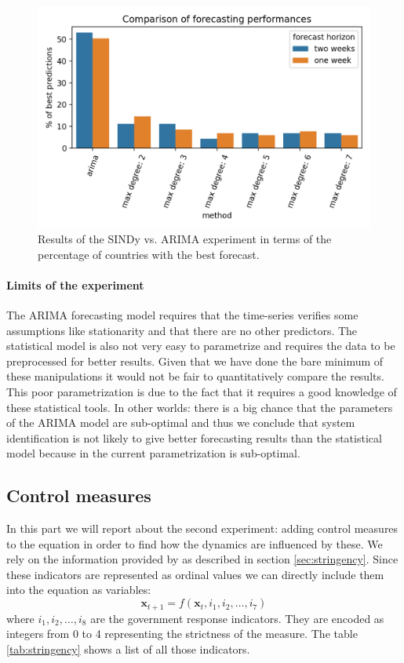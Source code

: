 \documentclass[12pt, letterpaper]{article}
\begin{document}
\begin{figure}[h]
\centering
\includegraphics[scale=0.8]{forecasting.png}
\caption{Results of the SINDy vs. ARIMA experiment in terms of the percentage of countries with the best forecast.}
\label{fig:forecast_frequency}
\end{figure}

\paragraph{Limits of the experiment}

The ARIMA forecasting model requires that the time-series verifies some assumptions like stationarity and that there are no other predictors. 
The statistical model is also not very easy to parametrize and requires the data to be preprocessed for better results.
Given that we have done the bare minimum of these manipulations it would not be fair to quantitatively compare the results.
This poor parametrization is due to the fact that it requires a good knowledge of these statistical tools.
In other worlds: there is a big chance that the parameters of the ARIMA model are sub-optimal and thus we conclude that system identification is not likely to give better forecasting results than the statistical model because in the current parametrization is sub-optimal.

\subsection{Control measures}

In this part we will report about the second experiment: adding control measures to the equation in order to find how the dynamics are influenced by these. 
We rely on the information provided by \cite{stringency} as described in section \ref{sec:stringency}.
Since these indicators are represented as ordinal values we can directly include them into the equation as variables: 
$$\mathbf{x}_{t+1} = f(\mathbf{x}_t, i_1, i_2, \dots, i_7)$$
where $i_1, i_2, \dots, i_8$ are the government response indicators. 
They are encoded as integers from 0 to 4 representing the strictness of the measure. The table \ref{tab:stringency} shows a list of all those indicators.
\end{document}
